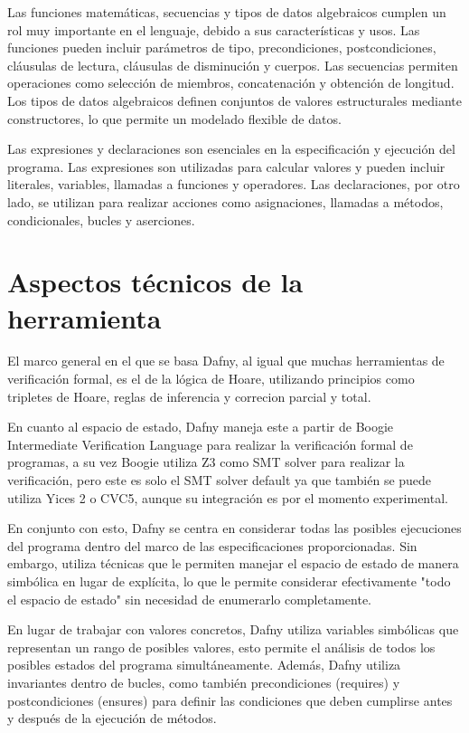\documentclass[runningheads]{llncs}
\begin{document}
Las funciones matemáticas, secuencias y tipos de datos algebraicos cumplen un rol muy importante en el lenguaje, debido a sus características y usos.
Las funciones pueden incluir parámetros de tipo, precondiciones, postcondiciones, cláusulas de lectura, cláusulas de disminución y cuerpos.
Las secuencias permiten operaciones como selección de miembros, concatenación y obtención de longitud.
Los tipos de datos algebraicos definen conjuntos de valores estructurales mediante constructores, lo que permite un modelado flexible de datos.

Las expresiones y declaraciones son esenciales en la especificación y ejecución del programa.
Las expresiones son utilizadas para calcular valores y pueden incluir literales, variables, llamadas a funciones y operadores.
Las declaraciones, por otro lado, se utilizan para realizar acciones como asignaciones, llamadas a métodos, condicionales, bucles y aserciones.

\section{Aspectos técnicos de la herramienta}
El marco general en el que se basa Dafny, al igual que muchas herramientas de verificación formal, es el de la lógica de Hoare,
utilizando principios como tripletes de Hoare, reglas de inferencia y correcion parcial y total.

En cuanto al espacio de estado, Dafny maneja este a partir de Boogie Intermediate Verification Language
para realizar la verificación formal de programas, a su vez Boogie utiliza Z3 como SMT solver para realizar la verificación,
pero este es solo el SMT solver default ya que también se puede utiliza Yices 2 o CVC5, aunque su integración es por el momento experimental.

En conjunto con esto, Dafny se centra en considerar todas las posibles ejecuciones del programa dentro del marco de las especificaciones proporcionadas. 
Sin embargo, utiliza técnicas que le permiten manejar el espacio de estado de manera simbólica en lugar de explícita, 
lo que le permite considerar efectivamente "todo el espacio de estado" sin necesidad de enumerarlo completamente.

En lugar de trabajar con valores concretos, Dafny utiliza variables simbólicas que representan un rango de posibles valores,
esto permite el análisis de todos los posibles estados del programa simultáneamente.
Además, Dafny utiliza invariantes dentro de bucles, como también precondiciones (requires) y postcondiciones (ensures) para definir las condiciones 
que deben cumplirse antes y después de la ejecución de métodos.
\end{document}
